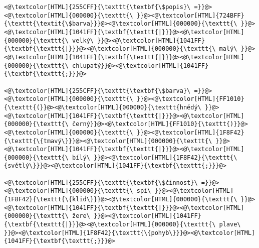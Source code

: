 \begin{lstlisting}
<@\textcolor[HTML]{255CFF}{\texttt{\textbf{\$popis}\ =}}@><@\textcolor[HTML]{000000}{\texttt{\ }}@><@\textcolor[HTML]{724BFF}{\texttt{\textit{\$barva}}}@><@\textcolor[HTML]{000000}{\texttt{\ }}@><@\textcolor[HTML]{1041FF}{\textbf{\texttt{|}}}@><@\textcolor[HTML]{000000}{\texttt{\ velký\ }}@><@\textcolor[HTML]{1041FF}{\textbf{\texttt{|}}}@><@\textcolor[HTML]{000000}{\texttt{\ malý\ }}@><@\textcolor[HTML]{1041FF}{\textbf{\texttt{|}}}@><@\textcolor[HTML]{000000}{\texttt{\ chlupatý}}@><@\textcolor[HTML]{1041FF}{\textbf{\texttt{;}}}@>

<@\textcolor[HTML]{255CFF}{\texttt{\textbf{\$barva}\ =}}@><@\textcolor[HTML]{000000}{\texttt{\ }}@><@\textcolor[HTML]{FF1010}{\texttt{(}}@><@\textcolor[HTML]{000000}{\texttt{hnědý\ }}@><@\textcolor[HTML]{1041FF}{\textbf{\texttt{|}}}@><@\textcolor[HTML]{000000}{\texttt{\ černý}}@><@\textcolor[HTML]{FF1010}{\texttt{)}}@><@\textcolor[HTML]{000000}{\texttt{\ }}@><@\textcolor[HTML]{1F8F42}{\texttt{\{tmavý\}}}@><@\textcolor[HTML]{000000}{\texttt{\ }}@><@\textcolor[HTML]{1041FF}{\textbf{\texttt{|}}}@><@\textcolor[HTML]{000000}{\texttt{\ bílý\ }}@><@\textcolor[HTML]{1F8F42}{\texttt{\{světlý\}}}@><@\textcolor[HTML]{1041FF}{\textbf{\texttt{;}}}@>

<@\textcolor[HTML]{255CFF}{\texttt{\textbf{\$činnost}\ =}}@><@\textcolor[HTML]{000000}{\texttt{\ spí\ }}@><@\textcolor[HTML]{1F8F42}{\texttt{\{klid\}}}@><@\textcolor[HTML]{000000}{\texttt{\ }}@><@\textcolor[HTML]{1041FF}{\textbf{\texttt{|}}}@><@\textcolor[HTML]{000000}{\texttt{\ žere\ }}@><@\textcolor[HTML]{1041FF}{\textbf{\texttt{|}}}@><@\textcolor[HTML]{000000}{\texttt{\ plave\ }}@><@\textcolor[HTML]{1F8F42}{\texttt{\{pohyb\}}}@><@\textcolor[HTML]{1041FF}{\textbf{\texttt{;}}}@>
\end{lstlisting}

